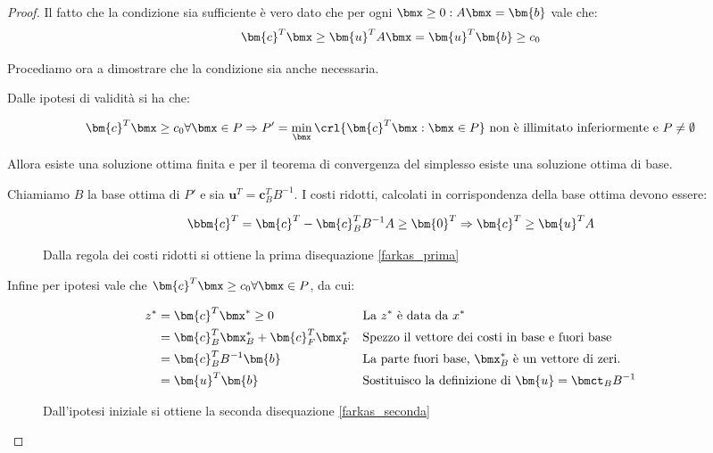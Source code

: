 \documentclass[\main/main.tex]{subfiles}
\begin{document}
\begin{proof}
  Il fatto che la condizione sia sufficiente è vero dato che per ogni $\bmx \geq 0: A\bmx=\bm{b}$ vale che:
  \[
    \bm{c}^T\bmx \geq \bm{u}^TA\bmx = \bm{u}^T\bm{b} \geq c_0
  \]

  Procediamo ora a dimostrare che la condizione sia anche necessaria.

  Dalle ipotesi di validità si ha che:

  \[
    \bm{c}^T\bmx \geq c_0 \forall \bmx \in P \Rightarrow P' = \min_{\bmx}\crl{\bm{c}^T\bmx: \bmx \in P} \text{ non è illimitato inferiormente e } P \neq \emptyset
  \]

  Allora esiste una soluzione ottima finita e per il teorema di convergenza del simplesso esiste una soluzione ottima di base.

  Chiamiamo $B$ la base ottima di $P'$ e sia $\bm{u}^T = \bm{c}^T_B B^{-1}$. I costi ridotti, calcolati in corrispondenza della base ottima devono essere:

  \begin{figure}
    \[
      \bbm{c}^T = \bm{c}^T - \bm{c}_B^TB^{-1}A \geq \bm{0}^T \Rightarrow \bm{c}^T \geq \bm{u}^TA
    \]
    \caption{Dalla regola dei costi ridotti si ottiene la prima disequazione \ref{farkas_prima}}
  \end{figure}

  Infine per ipotesi vale che $\bm{c}^T \bmx \geq c_0 \forall \bmx \in P$, da cui:

  \begin{figure}
    \begin{align*}
      z^* & = \bm{c}^T\bmx^* \geq 0                     &  & \text{La $z^*$ è data da $x^*$}                                \\
          & = \bm{c}_B^T \bmx^*_B + \bm{c}_F^T \bmx^*_F &  & \text{Spezzo il vettore dei costi in base e fuori base}        \\
          & = \bm{c}_B^TB^{-1}\bm{b}                    &  & \text{La parte fuori base, $\bmx^*_B$ è un vettore di zeri.}   \\
          & = \bm{u}^T\bm{b}                            &  & \text{Sostituisco la definizione di $\bm{u} = \bmct_B B^{-1}$}
    \end{align*}
    \caption{Dall'ipotesi iniziale si ottiene la seconda disequazione \ref{farkas_seconda}}
  \end{figure}

\end{proof}
\end{document}
